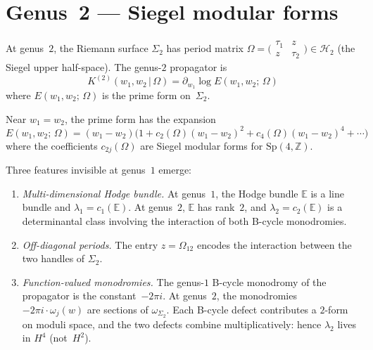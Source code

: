 \section{Genus~2 --- Siegel modular forms}\label{sec:frame-genus2}

At genus~$2$, the Riemann surface $\Sigma_2$ has period matrix
$\Omega = \bigl(\begin{smallmatrix} \tau_1 & z \\ z & \tau_2
\end{smallmatrix}\bigr) \in \mathcal{H}_2$ (the Siegel upper
half-space).  The genus-$2$ propagator is
\begin{equation}\label{eq:frame-genus2-propagator}
K^{(2)}(w_1, w_2 \,|\, \Omega)
= \partial_{w_1} \log E(w_1, w_2;\, \Omega)
\end{equation}
where $E(w_1, w_2;\, \Omega)$ is the prime form on~$\Sigma_2$.

Near $w_1 = w_2$, the prime form has the expansion
\begin{equation}\label{eq:frame-prime-form-expansion}
E(w_1, w_2;\, \Omega)
= (w_1 - w_2)\bigl(1 + c_2(\Omega)(w_1 - w_2)^2
+ c_4(\Omega)(w_1 - w_2)^4 + \cdots\bigr)
\end{equation}
where the coefficients $c_{2j}(\Omega)$ are Siegel modular forms
for $\mathrm{Sp}(4, \mathbb{Z})$.

Three features invisible at genus~$1$ emerge:
\begin{enumerate}
\item \emph{Multi-dimensional Hodge bundle.}
  At genus~$1$, the Hodge bundle $\mathbb{E}$ is a line bundle and
  $\lambda_1 = c_1(\mathbb{E})$.  At genus~$2$, $\mathbb{E}$ has
  rank~$2$, and $\lambda_2 = c_2(\mathbb{E})$ is a determinantal
  class involving the interaction of both B-cycle monodromies.

\item \emph{Off-diagonal periods.}
  The entry $z = \Omega_{12}$ encodes the interaction between the
  two handles of $\Sigma_2$.

\item \emph{Function-valued monodromies.}
  The genus-$1$ B-cycle monodromy of the propagator is the
  constant~$-2\pi i$.  At genus~$2$, the monodromies
  $-2\pi i \cdot \omega_j(w)$ are sections of
  $\omega_{\Sigma_2}$.  Each B-cycle defect contributes a
  $2$-form on moduli space, and the two defects combine
  multiplicatively: hence $\lambda_2$ lives in $H^4$
  (not~$H^2$).
\end{enumerate}

